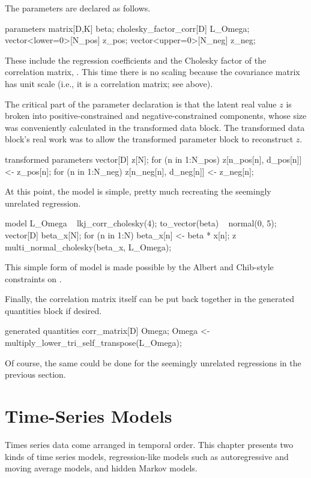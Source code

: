 The parameters are declared as follows.
%
\begin{stancode}
parameters {
  matrix[D,K] beta;
  cholesky_factor_corr[D] L_Omega;
  vector<lower=0>[N_pos] z_pos;
  vector<upper=0>[N_neg] z_neg;
}
\end{stancode}
%
These include the regression coefficients  and the Cholesky
factor of the correlation matrix, .  This time there is
no scaling because the covariance matrix has unit scale (i.e., it is a
correlation matrix;  see above). 

The critical part of the parameter declaration is that the latent real
value $z$ is broken into positive-constrained and negative-constrained
components, whose size was conveniently calculated in the transformed
data block.  The transformed data block's real work was to allow the
transformed parameter block to reconstruct $z$.
%
\begin{stancode}
transformed parameters {
  vector[D] z[N];
  for (n in 1:N_pos)
    z[n_pos[n], d_pos[n]] <- z_pos[n];
  for (n in 1:N_neg)
    z[n_neg[n], d_neg[n]] <- z_neg[n];
}
\end{stancode}

At this point, the model is simple, pretty much recreating the
seemingly unrelated regression.
%
\begin{stancode}
model {
  L_Omega ~ lkj_corr_cholesky(4);
  to_vector(beta) ~ normal(0, 5);
  { 
    vector[D] beta_x[N];
    for (n in 1:N) 
      beta_x[n] <- beta * x[n];
    z ~ multi_normal_cholesky(beta_x, L_Omega);
  }
}
\end{stancode}
%
This simple form of model is made possible by the Albert and
Chib-style constraints on .

Finally, the correlation matrix itself can be put back together in the
generated quantities block if desired. 
%
\begin{stancode}
generated quantities {
  corr_matrix[D] Omega;
  Omega <- multiply_lower_tri_self_transpose(L_Omega);  
}
\end{stancode}
%
Of course, the same could be done for the seemingly unrelated
regressions in the previous section.

\chapter{Time-Series Models}

\noindent
Times series data come arranged in temporal order.  This chapter
presents two kinds of time series models, regression-like models such
as autoregressive and moving average models, and hidden Markov models. 

